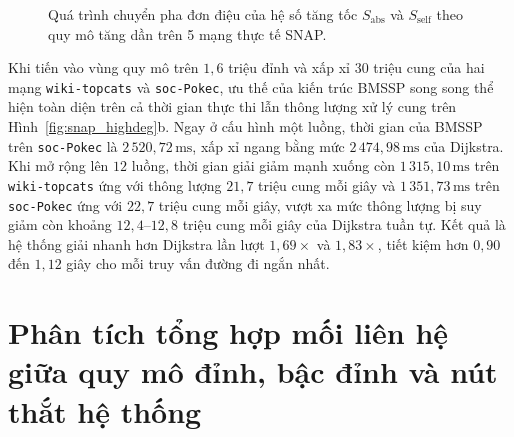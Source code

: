 \begin{figure}[!htb]
{%
}
\caption{Quá trình chuyển pha đơn điệu của hệ số tăng tốc $S_{\mathrm{abs}}$ và $S_{\mathrm{self}}$ theo quy mô tăng dần trên 5 mạng thực tế SNAP.}
\label{fig:tikz_snap_bars}
\end{figure}

Khi tiến vào vùng quy mô trên $1{,}6$ triệu đỉnh và xấp xỉ $30$ triệu cung của hai mạng \texttt{wiki-topcats} và \texttt{soc-Pokec}, ưu thế của kiến trúc BMSSP song song thể hiện toàn diện trên cả thời gian thực thi lẫn thông lượng xử lý cung trên Hình~\ref{fig:snap_highdeg}b. Ngay ở cấu hình một luồng, thời gian của BMSSP trên \texttt{soc-Pokec} là $2\,520{,}72\,\mathrm{ms}$, xấp xỉ ngang bằng mức $2\,474{,}98\,\mathrm{ms}$ của Dijkstra. Khi mở rộng lên $12$ luồng, thời gian giải giảm mạnh xuống còn $1\,315{,}10\,\mathrm{ms}$ trên \texttt{wiki-topcats} ứng với thông lượng $21{,}7$ triệu cung mỗi giây và $1\,351{,}73\,\mathrm{ms}$ trên \texttt{soc-Pokec} ứng với $22{,}7$ triệu cung mỗi giây, vượt xa mức thông lượng bị suy giảm còn khoảng $12{,}4$--$12{,}8$ triệu cung mỗi giây của Dijkstra tuần tự. Kết quả là hệ thống giải nhanh hơn Dijkstra lần lượt $1{,}69\times$ và $1{,}83\times$, tiết kiệm hơn $0{,}90$ đến $1{,}12$ giây cho mỗi truy vấn đường đi ngắn nhất.

\section{Phân tích tổng hợp mối liên hệ giữa quy mô đỉnh, bậc đỉnh và nút thắt hệ thống}\label{sec:c3-tong-hop}

